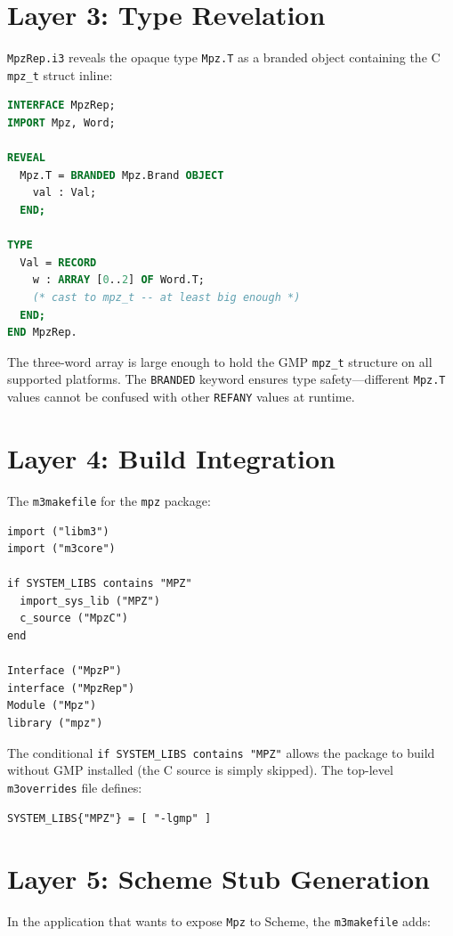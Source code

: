 \documentclass[12pt]{report}
\begin{document}
\section{Layer 3: Type Revelation}

{\tt MpzRep.i3} reveals the opaque type {\tt Mpz.T} as a branded
object containing the C {\tt mpz\_t} struct inline:

\begin{lstlisting}[language=Modula3]
INTERFACE MpzRep;
IMPORT Mpz, Word;

REVEAL
  Mpz.T = BRANDED Mpz.Brand OBJECT
    val : Val;
  END;

TYPE
  Val = RECORD
    w : ARRAY [0..2] OF Word.T;
    (* cast to mpz_t -- at least big enough *)
  END;
END MpzRep.
\end{lstlisting}

\noindent The three-word array is large enough to hold the GMP
{\tt mpz\_t} structure on all supported platforms.  The {\tt BRANDED}
keyword ensures type safety---different {\tt Mpz.T} values cannot be
confused with other {\tt REFANY} values at runtime.

\section{Layer 4: Build Integration}

The {\tt m3makefile} for the {\tt mpz} package:

\begin{lstlisting}[language={}]
import ("libm3")
import ("m3core")

if SYSTEM_LIBS contains "MPZ"
  import_sys_lib ("MPZ")
  c_source ("MpzC")
end

Interface ("MpzP")
interface ("MpzRep")
Module ("Mpz")
library ("mpz")
\end{lstlisting}

\noindent The conditional {\tt if SYSTEM\_LIBS contains "MPZ"}
allows the package to build without GMP installed (the C source
is simply skipped).  The top-level {\tt m3overrides} file defines:
\begin{lstlisting}[language={}]
SYSTEM_LIBS{"MPZ"} = [ "-lgmp" ]
\end{lstlisting}

\section{Layer 5: Scheme Stub Generation}

In the application that wants to expose {\tt Mpz} to Scheme, the
{\tt m3makefile} adds:
\end{document}
